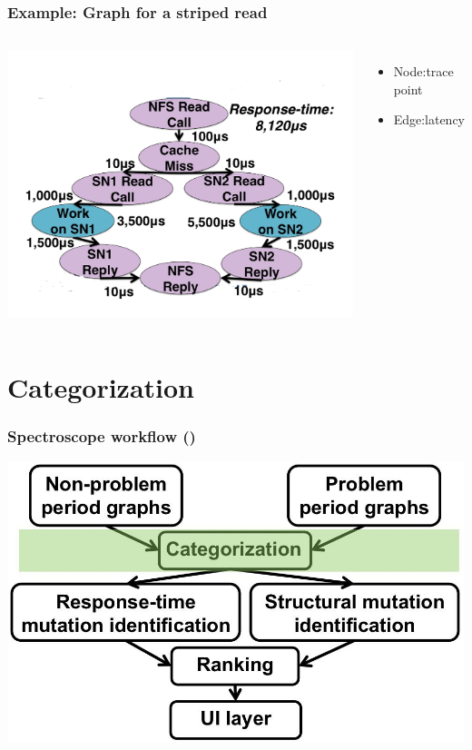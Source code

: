 \documentclass[11pt]{beamer}
\begin{document}
\begin{frame}
\frametitle{Example: Graph for a striped read}
\begin{columns}
\includegraphics[width=\textwidth,height=.9\textheight]{res/end-to-end.jpg}
\begin{itemize}
  \item Node:trace point
  \item Edge:latency
\end{itemize}
\end{columns}
\end{frame}

\section{Categorization}
\begin{frame}
\frametitle{Spectroscope workflow ()}
\includegraphics[width=\textwidth]{res/work2.jpg}
\end{frame}
\end{document}
